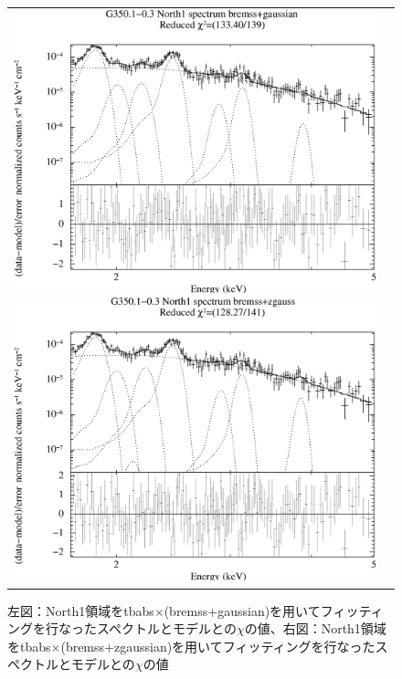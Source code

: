 \documentclass[a4j]{jarticle}%
\begin{document}
\begin{figure}[H]
\begin{center}
\begin{tabular}{cc}

\begin{minipage}{0.5\hsize}
\begin{center}
\includegraphics[scale=0.30]{./ps/North1_bremss+gaussian.eps}
\end{center}
\end{minipage}

\begin{minipage}{0.5\hsize}
\begin{center}
\includegraphics[scale=0.30]{./ps/North1_bremss+zgaussian.eps}
\end{center}
\end{minipage}
\end{tabular}
\caption{左図：North1領域をtbabs$\times$(bremss+gaussian)を用いてフィッティングを行なったスペクトルとモデルとの$\chi$の値、右図：North1領域をtbabs$\times$(bremss+zgaussian)を用いてフィッティングを行なったスペクトルとモデルとの$\chi$の値}
\label{fig:brem_North1}
\end{center}
\end{figure}
\end{document}
